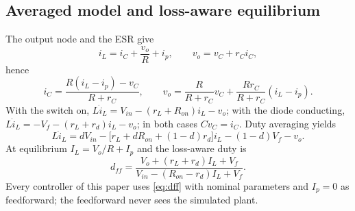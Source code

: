 \subsection{Averaged model and loss-aware equilibrium}
The output node and the ESR give
\begin{equation}
i_L=i_C+\frac{v_o}{R}+i_p,\qquad v_o=v_C+r_Ci_C,
\label{eq:node}
\end{equation}
hence
\begin{equation}
i_C=\frac{R(i_L-i_p)-v_C}{R+r_C},\qquad
v_o=\frac{R}{R+r_C}v_C+\frac{Rr_C}{R+r_C}(i_L-i_p).
\label{eq:vo}
\end{equation}
With the switch on, $L\dot i_L=V_{in}-(r_L+R_{on})i_L-v_o$; with the diode
conducting, $L\dot i_L=-V_f-(r_L+r_d)i_L-v_o$; in both cases $C\dot v_C=i_C$.
Duty averaging yields
\begin{equation}
L\dot i_L=dV_{in}-\big[r_L+dR_{on}+(1-d)r_d\big]i_L-(1-d)V_f-v_o .
\label{eq:avg}
\end{equation}
At equilibrium $I_L=V_o/R+I_p$ and the loss-aware duty is
\begin{equation}
d_{ff}=\frac{V_o+(r_L+r_d)I_L+V_f}{V_{in}-(R_{on}-r_d)I_L+V_f}.
\label{eq:dff}
\end{equation}
Every controller of this paper uses \eqref{eq:dff} with nominal parameters and
$I_p=0$ as feedforward; the feedforward never sees the simulated plant.

